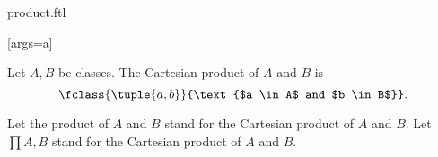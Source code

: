 \documentclass{article}
\begin{document}
\begin{smodule}[creators={Marcel Schütz}]{product.ftl}

  [args=a]{}

  \begin{fdefinition*}[label=1589561467600896]
    Let $A, B$ be classes.
    The Cartesian product of $A$ and $B$ is
    \[\fclass{\tuple{a,b}}{\text{$a \in A$ and $b \in B$}}.\]
  \end{fdefinition*}

  \begin{fconvention*}
    Let the product of $A$ and $B$ stand for the Cartesian product of $A$ and $B$.
    Let $\prod{A,B}$ stand for the Cartesian product of $A$ and $B$.
  \end{fconvention*}
\end{smodule}
\end{document}
